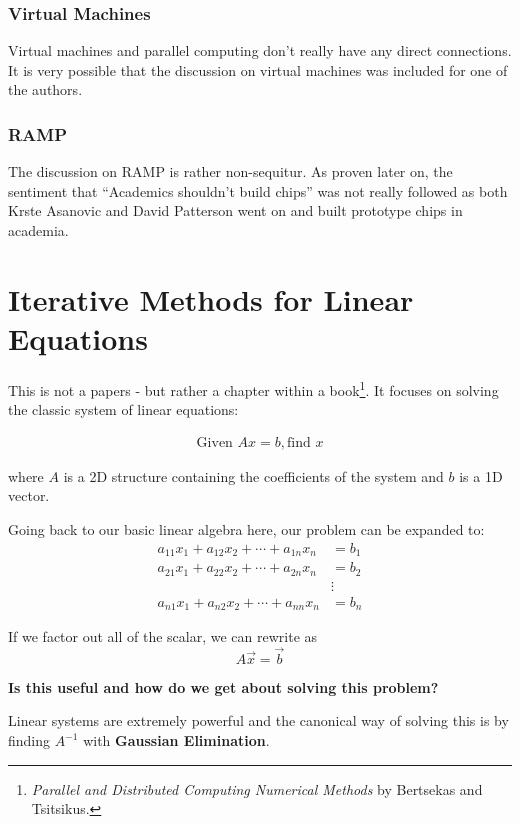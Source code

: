 \subsubsection{Virtual Machines}

Virtual machines and parallel computing don't really have any direct connections. It is very possible that the discussion on virtual machines was included for one of the authors.

\subsubsection{RAMP}

The discussion on RAMP is rather non-sequitur. As proven later on, the sentiment that ``Academics shouldn't build chips'' was not really followed as both Krste Asanovic and David Patterson went on and built prototype chips in academia.

\section{Iterative Methods for Linear Equations}

This is not a papers - but rather a chapter within a book\footnote{\textit{Parallel and Distributed Computing Numerical Methods} by Bertsekas and Tsitsikus.}. It focuses on solving the classic system of linear equations:

\begin{align*}
    \text{Given }Ax = b, \text{find } x
\end{align*}

where $A$ is a 2D structure containing the coefficients of the system and $b$ is a 1D vector.

Going back to our basic linear algebra here, our problem can be expanded to:
\begin{align*}
    a_{11} x_{1} + a_{12} x_{2} + \cdots + a_{1n} x_{n} &= b_{1} \\
    a_{21} x_{1} + a_{22} x_{2} + \cdots + a_{2n} x_{n} &= b_{2} \\
    & \vdots \\
    a_{n1} x_{1} + a_{n2} x_{2} + \cdots + a_{nn} x_{n} &= b_{n}
\end{align*}

If we factor out all of the scalar, we can rewrite as
\[
A \vec{x} = \vec{b}
\]

\textbf{Is this useful and how do we get about solving this problem?}

Linear systems are extremely powerful and the canonical way of solving this is by finding $A^{-1}$ with \textbf{Gaussian Elimination}.


